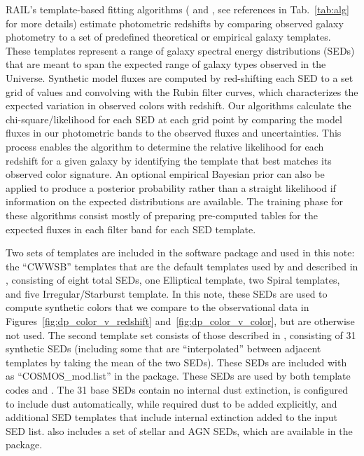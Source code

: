 RAIL’s template-based fitting algorithms ( and , see references in Tab.~\ref{tab:alg} for more details) estimate photometric redshifts by comparing observed galaxy photometry to a set of predefined theoretical or empirical galaxy templates.  These templates represent a range of galaxy spectral energy distributions (SEDs) that are meant to span the expected range of galaxy types observed in the Universe.  Synthetic model fluxes are computed by red-shifting each SED to a set grid of values and convolving with the Rubin filter curves,  which characterizes the expected variation in observed colors with redshift.  Our algorithms calculate the chi-square/likelihood for each SED at each grid point by comparing the model fluxes in our photometric bands to the observed fluxes and uncertainties.  This process enables the algorithm to determine the relative likelihood for each redshift for a given galaxy by identifying the template that best matches its observed color signature.  An optional empirical Bayesian prior can also be applied to produce a posterior probability rather than a straight likelihood if information on the expected distributions are available.  The training phase for these algorithms consist mostly of preparing pre-computed tables for the expected fluxes in each filter band for each SED template.

Two sets of templates are included in the  software package and used in this note: the ``CWWSB'' templates that are the default templates used by  and described in \citet[]{Coe:06}, consisting of eight total SEDs, one Elliptical template, two Spiral templates, and five Irregular/Starburst template.  In this note, these SEDs are used to compute synthetic colors that we compare to the observational data in Figures~\ref{fig:dp_color_v_redshift} and~\ref{fig:dp_color_v_color}, but are otherwise not used.  The second template set consists of those described in \citet[]{Ilbert:09}, consisting of 31 synthetic SEDs (including some that are ``interpolated'' between adjacent templates by taking the mean of the two SEDs).  These SEDs are included with  as ``COSMOS\_mod.list'' in the  package.  These SEDs are used by both template codes  and .  The 31 base SEDs contain no internal dust extinction,  is configured to include dust automatically, while  required dust to be added explicitly, and additional SED templates that include internal extinction added to the input SED list.  also includes a set of stellar and AGN SEDs, which are available in the  package.


